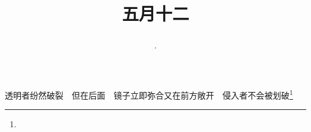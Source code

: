 \title{\date[d=17,m=6,y=2024][year:cn-y,年,month:cn,day:cn,日,·,weekday]·五月十二 }
透明者纷然破裂　但在后面　镜子立即弥合又在前方敞开　侵入者不会被划破\footnote{ }

